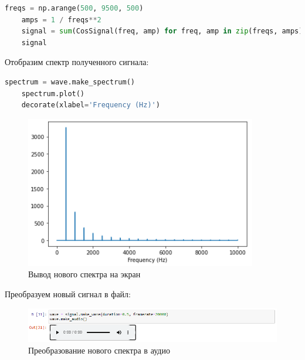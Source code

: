 \documentclass[a4paper]{article}
\begin{document}
\begin{lstlisting}[language=Python, caption= Другой подход]
    freqs = np.arange(500, 9500, 500)
    amps = 1 / freqs**2
    signal = sum(CosSignal(freq, amp) for freq, amp in zip(freqs, amps))
    signal
\end{lstlisting}   

        Отобразим спектр полученного сигнала:
        
\begin{lstlisting}[language=Python, caption= Отображение спектра нового сигнала]
    spectrum = wave.make_spectrum()
    spectrum.plot()
    decorate(xlabel='Frequency (Hz)')
\end{lstlisting}               
            
            \begin{figure}[H]
                \centering
                \includegraphics[width=\textwidth]{ex_6_sawtooth_spectrum_result.png}
                \caption{Вывод нового спектра на экран}
                \label{fig:ex_6_sawtooth_spectrum_result}
            \end{figure}
            
            Преобразуем новый сигнал в файл:
            
            \begin{figure}[H]
                \centering
                \includegraphics[width=\textwidth]{ex_6_sawtooth_spectrum_result_audio.png}
                \caption{Преобразование нового спектра в аудио}
                \label{fig:ex_6_sawtooth_spectrum_result_audio}
            \end{figure}
            
\end{document}
